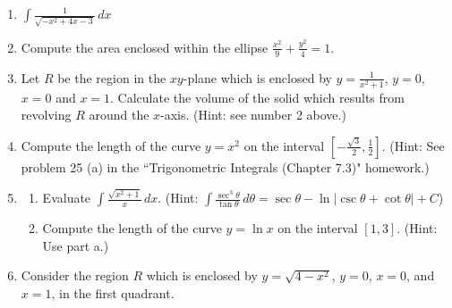 \documentclass[12pt]{article}
\newif\ifans
\begin{document}
\begin{enumerate}
\ifans{\fbox{$\frac{1}{4}\arctan{\left(x-\frac{1}{4}\right)}+C$}} \fi

\item $\int \frac{1}{\sqrt{-x^2+4x-3}} \,dx$

\ifans{\fbox{$\sin^{-1}(x-2)+C$}} \fi

\item Compute the area enclosed within the ellipse $\frac{x^2}{9}+\frac{y^2}{4}=1$.

\ifans{\fbox{$6\pi$}} \fi

\item Let $R$ be the region in the $xy$-plane which is enclosed by $y=\frac{1}{x^2+1}$, $y=0$, $x=0$ and $x=1$.  Calculate the volume of the solid which results from revolving $R$ around the $x$-axis.  (Hint: see number 2 above.)

\ifans{\fbox{$\frac{\pi}{4}\left(\frac{\pi}{2}+1\right)$; Detailed Solution: \textcolor{blue}{\href{http://www.math.drexel.edu/classes/Calculus/resources/Math122HW/Solutions/122_16_Trig_Sub_14.pdf}{Here}}}} \fi

\item Compute the length of the curve $y=x^2$ on the interval $\left[-\frac{\sqrt{3}}{2},\frac{1}{2}\right]$.  (Hint: See problem 25 (a) in the ``Trigonometric Integrals (Chapter 7.3)" homework.)

\ifans{\fbox{$\frac{\sqrt{2}}{4}+\frac{1}{4}\ln{\left|\sqrt{2}+1\right|}+\frac{\sqrt{3}}{2}-\frac{1}{4}\ln{\left|2-\sqrt{3}\right|}$}} \fi

\item \begin{enumerate}

\item Evaluate $\int \frac{\sqrt{x^2+1}}{x} \,dx$.  (Hint: $\int \frac{\sec^3{\theta}}{\tan{\theta}} \,d\theta = \sec{\theta}-\ln{|\csc{\theta}+\cot{\theta}|}+C$)

\ifans{\fbox{$\sqrt{x^2+1}-\ln{\left|\frac{\sqrt{x^2+1}+1}{x}\right|}+C$}} \fi

\item Compute the length of the curve $y=\ln{x}$ on the interval $[1,3]$.  (Hint: Use part a.)

\ifans{\fbox{$\sqrt{10}-\ln{\left(\frac{\sqrt{10}+1}{3}\right)}-\sqrt{2}+\ln{\left(\sqrt{2}+1\right)}$}} \fi

\end{enumerate}

\item Consider the region $R$ which is enclosed by $y=\sqrt{4-x^2}$, $y=0$, $x=0$, and $x=1$, in the first quadrant.


\end{enumerate}
\end{document}
